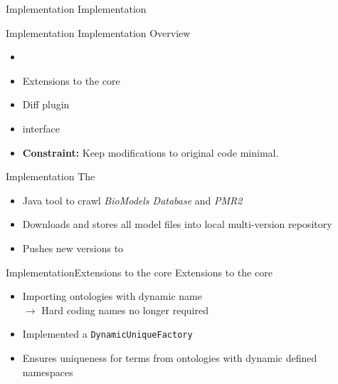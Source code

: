 \begin{frame}{Implementation}{}
	\centering
	\LARGE Implementation
\end{frame}

\begin{frame}{Implementation}{}
	{\Large Implementation Overview}
	\\[2.5em]
	\begin{itemize}
		\item \modelcrawler
		\item Extensions to the \masymos core
		\item Diff plugin
		\item \rest interface\\[2em]
		\item \textbf{Constraint:} Keep modifications to original \masymos code minimal.
	\end{itemize}
\end{frame}

\begin{frame}{Implementation}{\modelcrawler}
	{\Large The \modelcrawler}
	\\[2.5em]
	\begin{itemize}
		\item Java tool to crawl \emph{BioModels Database} and \emph{PMR2}
		\item Downloads and stores all model files into local multi-version repository
		\item Pushes new versions to \masymos
	\end{itemize}
\end{frame}

\begin{frame}{Implementation}{Extensions to the \masymos core}
	{\Large Extensions to the \masymos core}
	\\[2.5em]
	\begin{itemize}
		\item Importing ontologies with dynamic name\\
			$\rightarrow$ Hard coding names no longer required
		\item Implemented a \texttt{DynamicUniqueFactory}
		\item Ensures uniqueness for terms from ontologies with dynamic defined namespaces
	\end{itemize}
\end{frame}

